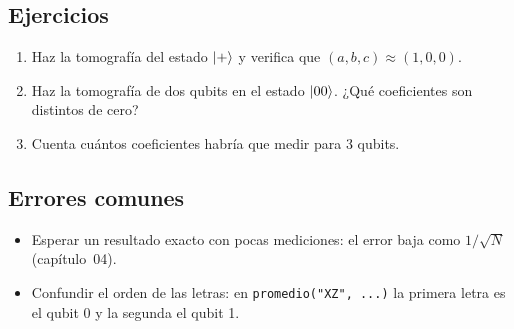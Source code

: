 \subsection{Ejercicios}
\begin{enumerate}
  \item Haz la tomografía del estado $\left|+\right\rangle$ y verifica que
    $(a,b,c)\approx(1,0,0)$.
  \item Haz la tomografía de dos qubits en el estado $\left|00\right\rangle$.
    ¿Qué coeficientes son distintos de cero?
  \item Cuenta cuántos coeficientes habría que medir para 3 qubits.
\end{enumerate}

\subsection{Errores comunes}
\begin{itemize}
  \item Esperar un resultado exacto con pocas mediciones: el error baja
    como $1/\sqrt N$ (capítulo~04).
  \item Confundir el orden de las letras: en \texttt{promedio("XZ", ...)} la
    primera letra es el qubit 0 y la segunda el qubit 1.
\end{itemize}


